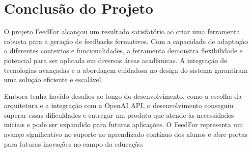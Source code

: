 \section{Conclusão do Projeto}

O projeto FeedFor alcançou um resultado satisfatório ao criar uma ferramenta robusta para a geração de feedbacks formativos. Com a capacidade de adaptação a diferentes contextos e funcionalidades, a ferramenta demonstra flexibilidade e potencial para ser aplicada em diversas áreas acadêmicas. A integração de tecnologias avançadas e a abordagem cuidadosa no design do sistema garantiram uma solução eficiente e escalável.

Embora tenha havido desafios ao longo do desenvolvimento, como a escolha da arquitetura e a integração com a OpenAI API, o desenvolvimento conseguiu superar essas dificuldades e entregar um produto que atende às necessidades iniciais e pode ser expandido para futuras aplicações. O FeedFor representa um avanço significativo no suporte ao aprendizado contínuo dos alunos e abre portas para futuras inovações no campo da educação.


